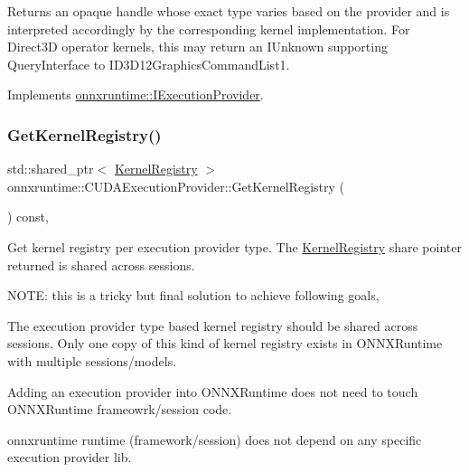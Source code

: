 Returns an opaque handle whose exact type varies based on the provider and is interpreted accordingly by the corresponding kernel implementation. For Direct3D operator kernels, this may return an I\+Unknown supporting Query\+Interface to I\+D3\+D12\+Graphics\+Command\+List1. 

Implements \mbox{\hyperlink{classonnxruntime_1_1IExecutionProvider_aebaeab04945539bc5db5942b63684ccb}{onnxruntime\+::\+I\+Execution\+Provider}}.

\mbox{\label{classonnxruntime_1_1CUDAExecutionProvider_a771c4dbe04b51b0c019e8b0e4648f61c}} 
\subsubsection{\texorpdfstring{Get\+Kernel\+Registry()}{GetKernelRegistry()}}
{\footnotesize\ttfamily std\+::shared\+\_\+ptr$<$ \mbox{\hyperlink{classonnxruntime_1_1KernelRegistry}{Kernel\+Registry}} $>$ onnxruntime\+::\+C\+U\+D\+A\+Execution\+Provider\+::\+Get\+Kernel\+Registry (\begin{DoxyParamCaption}{ }\end{DoxyParamCaption}) const\hspace{0.3cm}{\ttfamily [override]}, {\ttfamily [virtual]}}

Get kernel registry per execution provider type. The \mbox{\hyperlink{classonnxruntime_1_1KernelRegistry}{Kernel\+Registry}} share pointer returned is shared across sessions.

N\+O\+TE\+: this is a tricky but final solution to achieve following goals,
\begin{DoxyEnumerate}
\item The execution provider type based kernel registry should be shared across sessions. Only one copy of this kind of kernel registry exists in O\+N\+N\+X\+Runtime with multiple sessions/models.
\item Adding an execution provider into O\+N\+N\+X\+Runtime does not need to touch O\+N\+N\+X\+Runtime frameowrk/session code.
\item onnxruntime runtime (framework/session) does not depend on any specific execution provider lib. 
\end{DoxyEnumerate}

